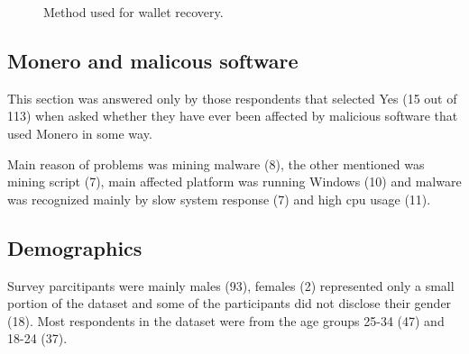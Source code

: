 \documentclass[
  printed, %
  table,   %
  nolof,     %
  nolot,     %
           oneside, color
]{fithesis3}
\begin{document}
\begin{center}
\begin{figure}[H]
\caption{Method used for wallet recovery.}
\label{chart:recoverymethod}\end{figure}\end{center}


\subsection{Monero and malicous software}
This section was answered only by those respondents that selected Yes (15 out of 113) when asked whether they have ever been affected by malicious software that used Monero in some way.

Main reason of problems was mining malware (8), the other mentioned was mining script (7), main affected platform was running Windows (10) and malware was recognized mainly by slow system response (7) and high cpu usage (11).
\subsection{Demographics}
Survey parcitipants were mainly males (93), females (2) represented only a small portion of the dataset and some of the participants did not disclose their gender (18). Most respondents in the dataset were from the age groups 25-34 (47) and 18-24 (37).
\end{document}
